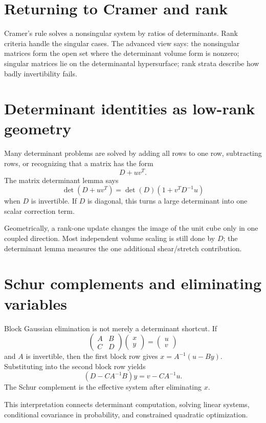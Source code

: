 \section{Returning to Cramer and rank}

Cramer's rule solves a nonsingular system by ratios of determinants.  Rank criteria handle the singular cases.  The advanced view says: the nonsingular matrices form the open set where the determinant volume form is nonzero; singular matrices lie on the determinantal hypersurface; rank strata describe how badly invertibility fails.

\section{Determinant identities as low-rank geometry}

Many determinant problems are solved by adding all rows to one row, subtracting rows, or recognizing that a matrix has the form
\[
  D+uv^T.
\]
The matrix determinant lemma says
\[
  \det(D+uv^T)=\det(D)(1+v^TD^{-1}u)
\]
when $D$ is invertible.  If $D$ is diagonal, this turns a large determinant into one scalar correction term.

Geometrically, a rank-one update changes the image of the unit cube only in one coupled direction.  Most independent volume scaling is still done by $D$; the determinant lemma measures the one additional shear/stretch contribution.

\section{Schur complements and eliminating variables}

Block Gaussian elimination is not merely a determinant shortcut.  If
\[
  \begin{pmatrix}A&B\\C&D\end{pmatrix}
  \begin{pmatrix}x\\y\end{pmatrix}
  =
  \begin{pmatrix}u\\v\end{pmatrix}
\]
and $A$ is invertible, then the first block row gives $x=A^{-1}(u-By)$.  Substituting into the second block row yields
\[
  (D-CA^{-1}B)y=v-CA^{-1}u.
\]
The Schur complement is the effective system after eliminating $x$.

This interpretation connects determinant computation, solving linear systems, conditional covariance in probability, and constrained quadratic optimization.

